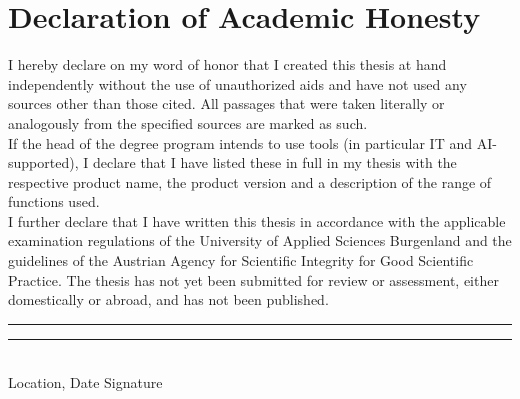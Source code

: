 \chapter*{Declaration of Academic Honesty}
I hereby declare on my word of honor that I created this thesis at hand independently without the use of unauthorized aids and have not used any sources other than those cited. All passages that were taken literally or analogously from the specified sources are marked as such. \\

\noindent If the head of the degree program intends to use tools (in particular IT and AI-supported), I declare that I have listed these in full in my thesis with the respective product name, the product version and a description of the range of functions used.\\

\noindent I further declare that I have written this thesis in accordance with the applicable examination regulations of the University of Applied Sciences Burgenland and the guidelines of the Austrian Agency for Scientific Integrity for Good Scientific Practice. The thesis has not yet been submitted for review or assessment, either domestically or abroad, and has not been published.
\vspace{3cm}


\noindent \rule[1em]{15em}{0.5pt}  \hfill \rule[1em]{15em}{0.5pt}\\ %
Location, Date \hfill Signature\\


